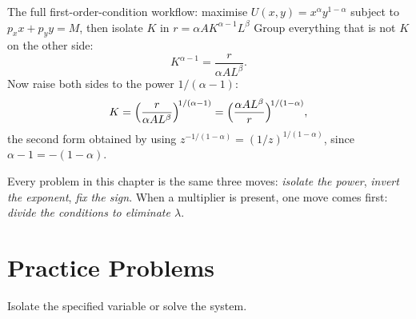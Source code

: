 \begin{worked}{The full first-order-condition workflow: maximise $U(x,y)=x^{\alpha}y^{1-\alpha}$ subject to $p_{x}x+p_{y}y=M$, then isolate $K$ in $r=\alpha AK^{\alpha-1}L^{\beta}$}
Group everything that is not $K$ on the other side:
\[
  K^{\alpha-1}=\frac{r}{\alpha A L^{\beta}} .
\]
Now raise both sides to the power $1/(\alpha-1)$:
\[
  K=\Bigl(\frac{r}{\alpha AL^{\beta}}\Bigr)^{\!1/(\alpha-1)}
   =\Bigl(\frac{\alpha AL^{\beta}}{r}\Bigr)^{\!1/(1-\alpha)} ,
\]
the second form obtained by using $z^{-1/(1-\alpha)}=(1/z)^{1/(1-\alpha)}$,
since $\alpha-1=-(1-\alpha)$.

Every problem in this chapter is the same three moves: \emph{isolate the
power}, \emph{invert the exponent}, \emph{fix the sign}. When a multiplier
is present, one move comes first: \emph{divide the conditions to eliminate
$\lambda$}.
\end{worked}

\section{Practice Problems}

Isolate the specified variable or solve the system.

